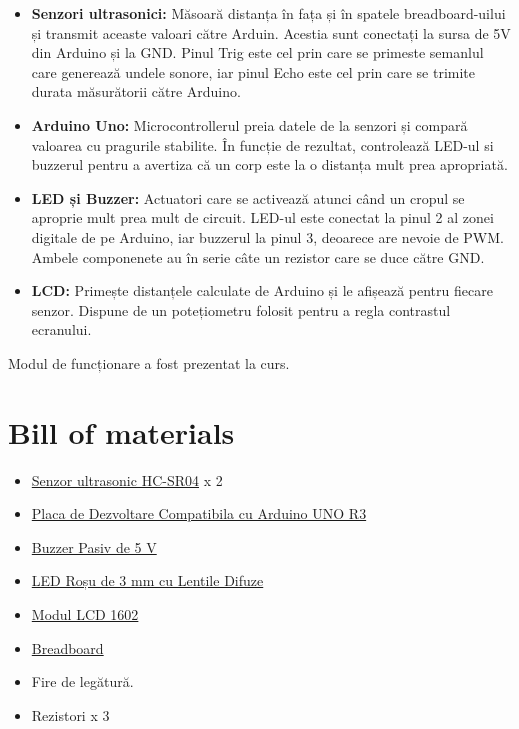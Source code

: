 \documentclass{article}
\begin{document}
\begin{itemize}
    \item \textbf{Senzori ultrasonici:} Măsoară distanța în fața și în spatele breadboard-uilui și transmit aceaste valoari către Arduin. Acestia sunt conectați la sursa de 5V din Arduino și la GND. Pinul Trig este cel prin care se primeste semanlul care generează undele sonore, iar pinul Echo este cel prin care se trimite durata măsurătorii către Arduino.
    \item \textbf{Arduino Uno:} Microcontrollerul preia datele de la senzori și compară valoarea cu pragurile stabilite. În funcție de rezultat, controlează LED-ul si buzzerul pentru a avertiza că un corp este la o distanța mult prea apropriată.
    \item \textbf{LED și Buzzer:} Actuatori care se activează atunci când un cropul se aproprie mult prea mult de circuit. LED-ul este conectat la pinul 2 al zonei digitale de pe Arduino, iar buzzerul la pinul 3, deoarece are nevoie de PWM. Ambele componenete au în serie câte un rezistor care se duce către GND.
    \item \textbf{LCD:} Primește distanțele calculate de Arduino și le afișează pentru fiecare senzor. Dispune de un potețiometru folosit pentru a regla contrastul ecranului.
\end{itemize}

Modul de funcționare a fost prezentat la curs.
\pagebreak

\section{Bill of materials}

\begin{itemize}
    \item \href{https://www.optimusdigital.ro/ro/senzori-senzori-ultrasonici/9-senzor-ultrasonic-hc-sr04-.html}{Senzor ultrasonic HC-SR04} x 2
    \item \href{https://www.optimusdigital.ro/ro/placi-avr/4561-placa-de-dezvoltare-compatibila-cu-arduino-uno-r3-atmega328p-atmega16u2-cablu-50-cm.html?search_query=arduino+uno&results=136}{Placa de Dezvoltare Compatibila cu Arduino UNO R3}
    \item \href{https://www.optimusdigital.ro/ro/audio-buzzere/634-buzzer-pasiv-de-5-v.html?search_query=buzzer&results=59}{Buzzer Pasiv de 5 V}
    \item \href{https://www.optimusdigital.ro/ro/optoelectronice-led-uri/696-led-rou-de-3-mm-cu-lentile-difuze.html?search_query=LED&results=782}{LED Roșu de 3 mm cu Lentile Difuze}
    \item \href{https://www.optimusdigital.ro/ro/optoelectronice-lcd-uri/867-modul-lcd-1602-cu-backlight-galben-verde-de-5v.html?search_query=lcd&results=202}{Modul LCD 1602}
    \item \href{https://www.optimusdigital.ro/ro/prototipare-breadboard-uri/8-breadboard-830-points.html?search_query=breadboard&results=141}{Breadboard}
    \item Fire de legătură.
    \item Rezistori x 3
\end{itemize}
\end{document}
